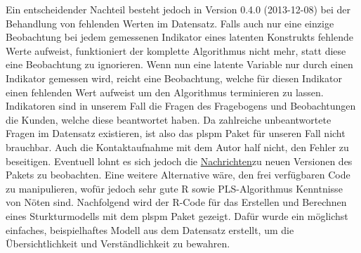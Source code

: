 \documentclass{article}\usepackage[]{graphicx}\usepackage[]{color}
\begin{document}
Ein entscheidender Nachteil besteht jedoch in Version 0.4.0 (2013-12-08) bei der Behandlung von fehlenden Werten im Datensatz. Falls auch nur eine einzige Beobachtung bei jedem gemessenen Indikator eines latenten Konstrukts fehlende Werte aufweist, funktioniert der komplette Algorithmus nicht mehr, statt diese eine Beobachtung zu ignorieren. Wenn nun eine latente Variable nur durch einen Indikator gemessen wird, reicht eine Beobachtung, welche für diesen Indikator einen fehlenden Wert aufweist um den Algorithmus terminieren zu lassen. Indikatoren sind in unserem Fall die Fragen des Fragebogens und Beobachtungen die Kunden, welche diese beantwortet haben. Da zahlreiche unbeantwortete Fragen im Datensatz existieren, ist also das plspm Paket für unseren Fall nicht brauchbar. Auch die Kontaktaufnahme mit dem Autor half nicht, den Fehler zu beseitigen. Eventuell lohnt es sich jedoch die \href{http://cran.r-project.org/web/packages/plspm/NEWS}{Nachrichten}zu neuen Versionen des Pakets zu beobachten. Eine weitere Alternative wäre, den frei verfügbaren Code zu manipulieren, wofür jedoch sehr gute R sowie PLS-Algorithmus Kenntnisse von Nöten sind. Nachfolgend wird der R-Code für das Erstellen und Berechnen eines Sturkturmodells mit dem plspm Paket gezeigt. Dafür wurde ein möglichst einfaches, beispielhaftes Modell aus dem Datensatz erstellt, um die Übersichtlichkeit und Verständlichkeit zu bewahren.
\end{document}
